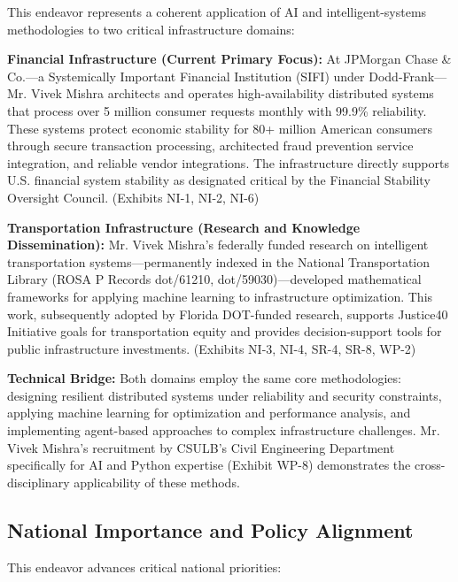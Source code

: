 \documentclass[11pt]{article}
\newcommand{\dr}{Mr. Vivek Mishra }
\newcommand{\drs}{Mr. Vivek Mishra's }
\begin{document}
This endeavor represents a coherent application of AI and intelligent-systems methodologies 
to two critical infrastructure domains:

\textbf{Financial Infrastructure (Current Primary Focus):} At JPMorgan Chase \& Co.—a 
Systemically Important Financial Institution (SIFI) under Dodd-Frank—\dr architects and 
operates high-availability distributed systems that process over 5 million consumer requests 
monthly with 99.9\% reliability. These systems protect economic stability for 80+ million 
American consumers through secure transaction processing, architected fraud prevention service integration, and reliable 
vendor integrations. The infrastructure directly supports U.S. financial system stability 
as designated critical by the Financial Stability Oversight Council. (Exhibits NI-1, NI-2, NI-6)

\textbf{Transportation Infrastructure (Research and Knowledge Dissemination):} \drs federally 
funded research on intelligent transportation systems—permanently indexed in the National 
Transportation Library (ROSA P Records dot/61210, dot/59030)—developed mathematical frameworks 
for applying machine learning to infrastructure optimization. This work, subsequently adopted 
by Florida DOT-funded research, supports Justice40 Initiative goals for transportation equity 
and provides decision-support tools for public infrastructure investments. (Exhibits NI-3, NI-4, SR-4, SR-8, WP-2)

\textbf{Technical Bridge:} Both domains employ the same core methodologies: designing resilient 
distributed systems under reliability and security constraints, applying machine learning for 
optimization and performance analysis, and implementing agent-based approaches to complex 
infrastructure challenges. \drs recruitment by CSULB's Civil Engineering Department specifically 
for AI and Python expertise (Exhibit WP-8) demonstrates the cross-disciplinary applicability 
of these methods.

\subsection{National Importance and Policy Alignment}

This endeavor advances critical national priorities:
\end{document}
